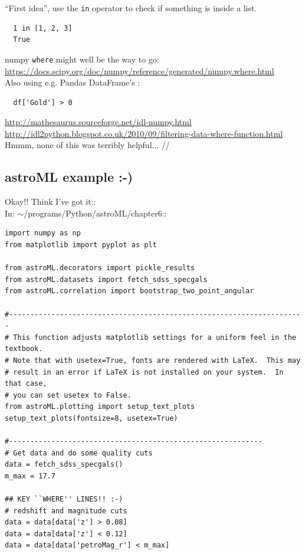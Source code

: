 \documentclass[11pt,a4paper]{article}
\begin{document}
\smallskip \smallskip 
\noindent
``First idea'', use the {\tt in} operator to check if something is inside a list.
\begin{lstlisting}
  1 in [1, 2, 3]
  True
\end{lstlisting}

\smallskip
\smallskip
\noindent
numpy {\tt where} might well be the way to go:\\
\href{https://docs.scipy.org/doc/numpy/reference/generated/numpy.where.html}{https://docs.scipy.org/doc/numpy/reference/generated/numpy.where.html}\\


\smallskip  
\smallskip 
\noindent
Also using e.g. Pandas DataFrame's : 
\begin{lstlisting}
  df['Gold'] > 0
\end{lstlisting}

\href{http://mathesaurus.sourceforge.net/idl-numpy.html}{http://mathesaurus.sourceforge.net/idl-numpy.html}\\
\href{http://idl2python.blogspot.co.uk/2010/09/filtering-data-where-function.html}{http://idl2python.blogspot.co.uk/2010/09/filtering-data-where-function.html}\\
Hmmm, none of this was terribly helpful... //
    
\smallskip \smallskip 
\noindent
\subsection{astroML example :-)}
Okay!! Think I've got it:: \\
In: $\sim$/programs/Python/astroML/chapter6::

\begin{lstlisting}
import numpy as np
from matplotlib import pyplot as plt

from astroML.decorators import pickle_results
from astroML.datasets import fetch_sdss_specgals
from astroML.correlation import bootstrap_two_point_angular

#----------------------------------------------------------------------
# This function adjusts matplotlib settings for a uniform feel in the textbook.
# Note that with usetex=True, fonts are rendered with LaTeX.  This may
# result in an error if LaTeX is not installed on your system.  In that case,
# you can set usetex to False.
from astroML.plotting import setup_text_plots
setup_text_plots(fontsize=8, usetex=True)

#------------------------------------------------------------
# Get data and do some quality cuts
data = fetch_sdss_specgals()
m_max = 17.7

## KEY ``WHERE'' LINES!! :-)
# redshift and magnitude cuts
data = data[data['z'] > 0.08]
data = data[data['z'] < 0.12]
data = data[data['petroMag_r'] < m_max]
\end{lstlisting}
\end{document}
